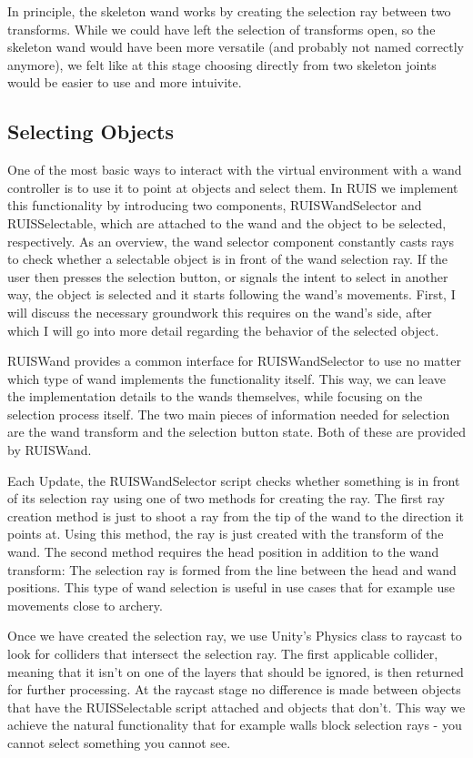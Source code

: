 \documentclass[12pt,a4paper,oneside,pdftex]{report}
\begin{document}
In principle, the skeleton wand works by creating the selection ray between two transforms. While we could have left the selection of transforms open, so the skeleton wand would have been more versatile (and probably not named correctly anymore), we felt like at this stage choosing directly from two skeleton joints would be easier to use and more intuivite.

\subsection{Selecting Objects}
\label{subsection:wandcontrollers:selection}

One of the most basic ways to interact with the virtual environment with a wand controller is to use it to point at objects and select them. In RUIS we implement this functionality by introducing two components, RUISWandSelector and RUISSelectable, which are attached to the wand and the object to be selected, respectively. As an overview, the wand selector component constantly casts rays to check whether a selectable object is in front of the wand selection ray. If the user then presses the selection button, or signals the intent to select in another way, the object is selected and it starts following the wand's movements. First, I will discuss the necessary groundwork this requires on the wand's side, after which I will go into more detail regarding the behavior of the selected object.

RUISWand provides a common interface for RUISWandSelector to use no matter which type of wand implements the functionality itself. This way, we can leave the implementation details to the wands themselves, while focusing on the selection process itself. The two main pieces of information needed for selection are the wand transform and the selection button state. Both of these are provided by RUISWand.

Each Update, the RUISWandSelector script checks whether something is in front of its selection ray using one of two methods for creating the ray. The first ray creation method is just to shoot a ray from the tip of the wand to the direction it points at. Using this method, the ray is just created with the transform of the wand. The second method requires the head position in addition to the wand transform: The selection ray is formed from the line between the head and wand positions. This type of wand selection is useful in use cases that for example use movements close to archery.

Once we have created the selection ray, we use Unity's Physics class to raycast to look for colliders that intersect the selection ray. The first applicable collider, meaning that it isn't on one of the layers that should be ignored, is then returned for further processing. At the raycast stage no difference is made between objects that have the RUISSelectable script attached and objects that don't. This way we achieve the natural functionality that for example walls block selection rays - you cannot select something you cannot see.
\end{document}
